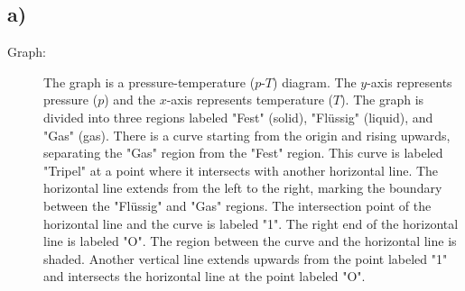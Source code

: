 

\subsection*{a)}

\begin{description}
    \item[Graph:] The graph is a pressure-temperature ($p$-$T$) diagram. The $y$-axis represents pressure ($p$) and the $x$-axis represents temperature ($T$). The graph is divided into three regions labeled "Fest" (solid), "Flüssig" (liquid), and "Gas" (gas). There is a curve starting from the origin and rising upwards, separating the "Gas" region from the "Fest" region. This curve is labeled "Tripel" at a point where it intersects with another horizontal line. The horizontal line extends from the left to the right, marking the boundary between the "Flüssig" and "Gas" regions. The intersection point of the horizontal line and the curve is labeled "1". The right end of the horizontal line is labeled "O". The region between the curve and the horizontal line is shaded. Another vertical line extends upwards from the point labeled "1" and intersects the horizontal line at the point labeled "O".
\end{description}
